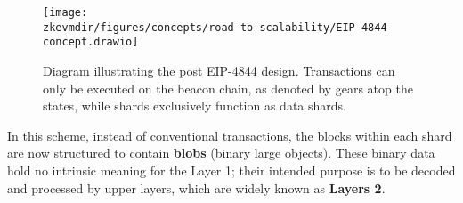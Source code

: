 \begin{enumerate}[(a)]
\begin{figure}[H]
\centering
\texttt{[image: \\zkevmdir/figures/concepts/road-to-scalability/EIP-4844-concept.drawio]}
\caption{Diagram illustrating the post EIP-4844 design. Transactions can only be executed on the beacon chain, as denoted by gears atop the states, while shards exclusively function as data shards.}
\label{fig:EIP4844}
\end{figure}

In this scheme, instead of conventional transactions, the blocks within each shard are now structured to contain \textbf{blobs} (binary large objects). These binary data hold no intrinsic meaning for the Layer 1; their intended purpose is to be decoded and processed by upper layers, which are widely known as \textbf{Layers 2}.


\end{enumerate}
